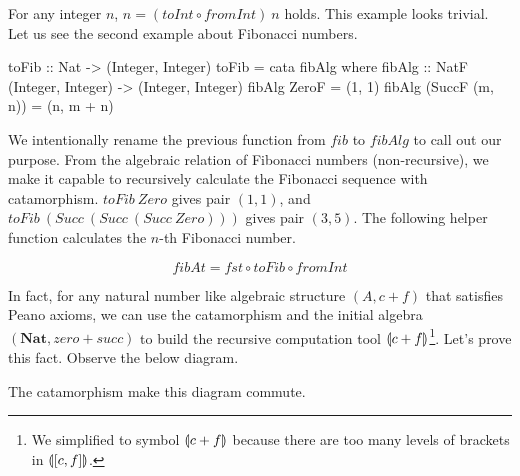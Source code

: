 \documentclass[b5paper]{article}
\begin{document}
For any integer $n$, $n = (toInt \circ fromInt)\ n$ holds. This example looks trivial. Let us see the second example about Fibonacci numbers.

\begin{Haskell}
toFib :: Nat -> (Integer, Integer)
toFib = cata fibAlg where
  fibAlg :: NatF (Integer, Integer) -> (Integer, Integer)
  fibAlg ZeroF = (1, 1)
  fibAlg (SuccF (m, n)) = (n, m + n)
\end{Haskell}

We intentionally rename the previous function from $fib$ to $fibAlg$ to call out our purpose. From the algebraic relation of Fibonacci numbers (non-recursive), we make it capable to recursively calculate the Fibonacci sequence with catamorphism. $toFib\ Zero$ gives pair $(1, 1)$, and $toFib\ (Succ\ (Succ\ (Succ\ Zero)))$ gives pair $(3, 5)$. The following helper function calculates the $n$-th Fibonacci number.

\[
fibAt = fst \circ toFib \circ fromInt
\]

In fact, for any natural number like algebraic structure $(A, c + f)$ that satisfies Peano axioms, we can use the catamorphism and the initial algebra $(\mathbf{Nat}, zero + succ)$ to build the recursive computation tool $\llparenthesis c + f \rrparenthesis$\footnote{We simplified to symbol $\llparenthesis c + f \rrparenthesis$ because there are too many levels of brackets in $\llparenthesis [c, f] \rrparenthesis$.}. Let's prove this fact. Observe the below diagram.

\begin{center}
\end{center}

The catamorphism make this diagram commute.
\end{document}
